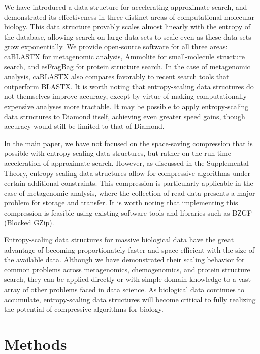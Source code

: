 \documentclass[review,preprint,12pt]{elsarticle}
\theoremstyle{definition}
\theoremstyle{remark}
\numberwithin{equation}{section}
\begin{document}
We have introduced a data structure for accelerating approximate search, and
demonstrated its effectiveness in three distinct areas of computational
molecular biology.
This data structure provably scales almost linearly with the entropy of the 
database, allowing search on large data sets to scale even as these data sets
grow exponentially.
We provide open-source software for all three areas: caBLASTX for metagenomic analysis,
Ammolite for small-molecule structure search, and esFragBag for protein structure search.
In the case of metagenomic analysis, caBLASTX also compares favorably to recent 
search tools that outperform BLASTX.
It is worth noting that entropy-scaling data structures do not themselves 
improve accuracy, except by virtue of making computationally expensive analyses 
more tractable.
It may be possible to apply entropy-scaling data
structures to Diamond itself, achieving even greater speed gains, though 
accuracy would still be limited to that of Diamond.

In the main paper, we have not focused on the space-saving compression that is
possible with entropy-scaling data structures, but rather on the run-time
acceleration of approximate search.
However, as discussed in the Supplemental Theory, entropy-scaling data structures
allow for compressive algorithms under certain additional constraints.
This compression is particularly applicable in the case of metagenomic analysis, where the collection of 
read data presents a major problem for storage and transfer.
It is worth noting that implementing this compression is feasible using existing software tools and libraries such as BZGF (Blocked GZip).

Entropy-scaling data structures for massive biological data have the great
advantage of becoming proportionately faster and space-efficient with the
size of the available data. Although we have demonstrated their scaling 
behavior for common problems across metagenomics, chemogenomics, and protein
structure search, they can be applied directly or with simple domain
knowledge to a vast array of other problems faced in data science. As
biological data continues to accumulate, entropy-scaling data structures
will become critical to fully realizing the potential of compressive
algorithms for biology. 

\section{Methods}
\end{document}
